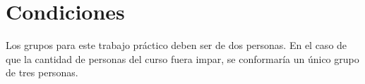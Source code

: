 \section{Condiciones}\label{sec:Condiciones}
Los grupos para este trabajo práctico deben ser de dos personas. En el caso de que la cantidad de personas del curso fuera impar, se conformaría un único grupo de tres personas.